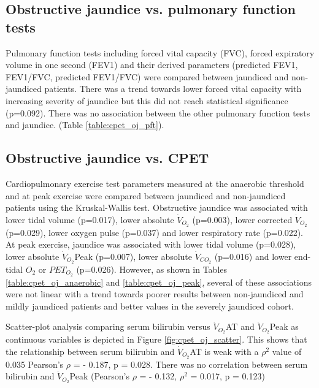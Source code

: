 

\subsection{Obstructive jaundice vs. pulmonary function tests}
Pulmonary function tests including forced vital capacity (FVC), forced expiratory volume in one second (FEV1) and their derived parameters (predicted FEV1, FEV1/FVC, predicted FEV1/FVC) were compared between jaundiced and non-jaundiced patients. 
There was a trend towards lower forced vital capacity with increasing severity of jaundice but this did not reach statistical significance (p=0.092). 
There was no association between the other pulmonary function tests and jaundice. (Table \ref{table:cpet_oj_pft}).



\subsection{Obstructive jaundice vs. CPET}
Cardiopulmonary exercise test parameters measured at the anaerobic threshold and at peak exercise were compared between jaundiced and non-jaundiced patients using the Kruskal-Wallis test. 
Obstructive jaundice was associated with lower tidal volume (p=0.017), lower absolute $\dot{V}_{O_2}$ (p=0.003), lower corrected $\dot{V}_{O_2}$ (p=0.029), lower oxygen pulse (p=0.037) and lower respiratory rate (p=0.022). 
At peak exercise, jaundice was associated with lower tidal volume (p=0.028), lower absolute $\dot{V}_{O_2}$Peak (p=0.007), lower absolute $\dot{V}_{CO_2}$ (p=0.016) and lower end-tidal $O_2$ or $PET_{O_2}$ (p=0.026). 
However, as shown in Tables \ref{table:cpet_oj_anaerobic} and \ref{table:cpet_oj_peak}, several of these associations were not linear with a trend towards poorer results between non-jaundiced and mildly jaundiced patients and better values in the severely jaundiced cohort. 




Scatter-plot analysis comparing serum bilirubin versus $\dot{V}_{O_2}$AT and $\dot{V}_{O_2}$Peak as continuous variables is depicted in Figure \ref{fig:cpet_oj_scatter}. 
This shows that the relationship between serum bilirubin and $\dot{V}_{O_2}$AT is weak with a $\rho^2$ value of 0.035 Pearson's $\rho$ = - 0.187, p = 0.028. 
There was no correlation between serum bilirubin and $\dot{V}_{O_2}$Peak (Pearson's $\rho$ = - 0.132, $\rho^2$ = 0.017, p = 0.123)

